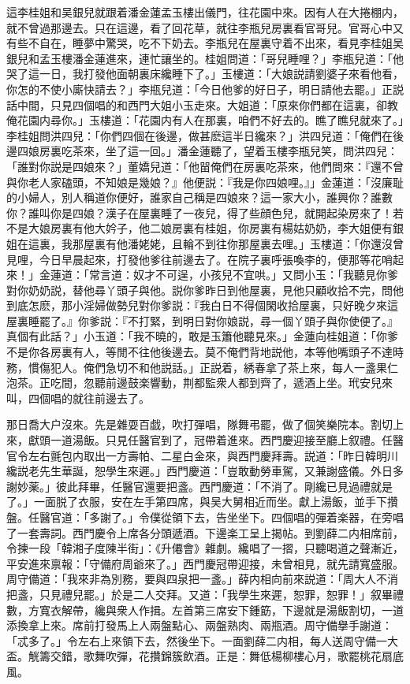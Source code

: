 這李桂姐和吴銀兒就跟着潘金蓮孟玉樓出儀門，往花園中來。因有人在大捲棚内，就不曾過那邊去。只在這邊，看了回花草，就往李瓶兒房裏看官哥兒。官哥心中又有些不自在，睡夢中驚哭，吃不下奶去。李瓶兒在屋裏守着不出來，看見李桂姐吴銀兒和孟玉樓潘金蓮進來，連忙讓坐的。桂姐問道：「哥兒睡哩？」李瓶兒道：「他哭了這一日，我打發他面朝裏床纔睡下了。」玉樓道：「大娘説請劉婆子來看他看，你怎的不使小廝快請去？」李瓶兒道：「今日他爹的好日子，明日請他去罷。」正説話中間，只見四個唱的和西門大姐小玉走來。大姐道：「原來你們都在這裏，卻教俺花園内尋你。」玉樓道：「花園内有人在那裏，咱們不好去的。瞧了瞧兒就來了。」李桂姐問洪四兒：「你們四個在後邊，做甚麽這半日纔來？」洪四兒道：「俺們在後邊四娘房裏吃茶來，坐了這一回。」潘金蓮聽了，望着玉樓李瓶兒笑，問洪四兒：「誰對你説是四娘來？」董嬌兒道：「他㽞俺們在房裏吃茶來，他們問來：『還不曾與你老人家磕頭，不知娘是幾娘？』他便説：『我是你四娘哩。』」金蓮道：「沒廉耻的小婦人，別人稱道你便好，誰家自己稱是四娘來？這一家大小，誰興你？誰數你？誰叫你是四娘？漢子在屋裏睡了一夜兒，得了些顔色兒，就開起染房來了！若不是大娘房裏有他大妗子，他二娘房裏有桂姐，你房裏有楊姑奶奶，李大姐便有銀姐在這裏，我那屋裏有他潘姥姥，且輪不到往你那屋裏去哩。」玉樓道：「你還沒曾見哩，今日早晨起來，打發他爹往前邊去了。在院子裏呼張喚李的，便那等花哨起來！」金蓮道：「常言道：奴才不可逞，小孩兒不宜哄。」又問小玉：「我聽見你爹對你奶奶説，替他尋丫頭子與他。説你爹昨日到他屋裏，見他只顧收拾不完，問他到底怎麽，那小淫婦做勢兒對你爹説：『我白日不得個閑收拾屋裏，只好晚夕來這屋裏睡罷了。』你爹説：『不打緊，到明日對你娘説，尋一個丫頭子與你使便了。』真個有此話？」小玉道：「我不曉的，敢是玉簫他聽見來。」金蓮向桂姐道：「你爹不是你各房裏有人，等閒不往他後邊去。莫不俺們背地説他，本等他嘴頭子不達時務，慣傷犯人。俺們急切不和他説話。」正説着，綉春拿了茶上來，每人一盞果仁泡茶。正吃間，忽聽前邊鼓楽響動，荆都監衆人都到齊了，遞酒上坐。玳安兒來叫，四個唱的就往前邊去了。

那日喬大户沒來。先是雜耍百戯，吹打彈唱，隊舞弔罷，做了個笑樂院本。割切上來，獻頭一道湯飯。只見任醫官到了，冠帶着進來。西門慶迎接至廳上叙禮。任醫官令左右氈包内取出一方壽帕、二星白金來，與西門慶拜壽。説道：「昨日韓明川纔説老先生華誕，恕學生來遲。」西門慶道：「豈敢動勞車駕，又兼謝盛儀。外日多謝妙薬。」彼此拜畢，任醫官還要把盞。西門慶道：「不消了。剛纔已見過禮就是了。」一面脱了衣服，安在左手第四席，與吴大舅相近而坐。獻上湯飯，並手下攢盤。任醫官道：「多謝了。」令僕從領下去，告坐坐下。四個唱的彈着楽器，在旁唱了一套壽詞。西門慶令上席各分頭遞酒。下邊楽工呈上揭帖。到劉薛二内相席前，令揀一段「韓湘子度陳半街」：《升僊會》雜劇。纔唱了一摺，只聽喝道之聲漸近，平安進來禀報：「守備府周爺來了。」西門慶冠帶迎接，未曾相見，就先請寬盛服。周守備道：「我來非為別務，要與四泉把一盞。」薛内相向前來説道：「周大人不消把盞，只見禮兒罷。」於是二人交拜。又道：「我學生來遲，恕罪，恕罪！」叙畢禮數，方寬衣解帶，纔與衆人作揖。左首第三席安下鍾筯，下邊就是湯飯割切，一道添換拿上來。席前打發馬上人兩盤點心、兩盤熟肉、兩瓶酒。周守備擧手謝道：「忒多了。」令左右上來領下去，然後坐下。一面劉薛二内相，每人送周守備一大盃。觥籌交錯，歌舞吹彈，花攢錦簇飲酒。正是：舞低楊柳樓心月，歌罷桃花扇底風。

